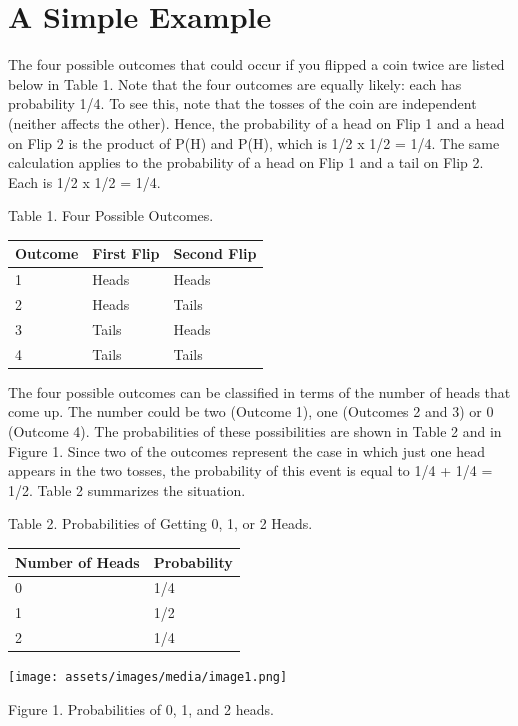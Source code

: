 \documentclass[
  11pt,
,
onecolumn,
openany
]{book}
\begin{document}
\hypertarget{a-simple-example}{%
\section{A Simple Example}\label{a-simple-example}}

The four possible outcomes that could occur if you flipped a coin twice are
listed below in Table 1. Note that the four outcomes are equally likely: each
has probability 1/4. To see this, note that the tosses of the coin are
independent (neither affects the other). Hence, the probability of a head on
Flip 1 and a head on Flip 2 is the product of P(H) and P(H), which is 1/2 x
1/2 = 1/4. The same calculation applies to the probability of a head on Flip 1
and a tail on Flip 2. Each is 1/2 x 1/2 = 1/4.

Table 1. Four Possible Outcomes.

\begin{longtable}[]{@{}lll@{}}
\toprule
Outcome & First Flip & Second Flip \\
\midrule
\endhead
1 & Heads & Heads \\
2 & Heads & Tails \\
3 & Tails & Heads \\
4 & Tails & Tails \\
\bottomrule
\end{longtable}

The four possible outcomes can be classified in terms of the number of heads
that come up. The number could be two (Outcome 1), one (Outcomes 2 and 3) or 0
(Outcome 4). The probabilities of these possibilities are shown in Table 2 and
in Figure 1. Since two of the outcomes represent the case in which just one
head appears in the two tosses, the probability of this event is equal to 1/4
+ 1/4 = 1/2. Table 2 summarizes the situation.

Table 2. Probabilities of Getting 0, 1, or 2 Heads.

\begin{longtable}[]{@{}ll@{}}
\toprule
Number of Heads & Probability \\
\midrule
\endhead
0 & 1/4 \\
1 & 1/2 \\
2 & 1/4 \\
\bottomrule
\end{longtable}

\texttt{[image: assets/images/media/image1.png]}

Figure 1. Probabilities of 0, 1, and 2 heads.
\end{document}
